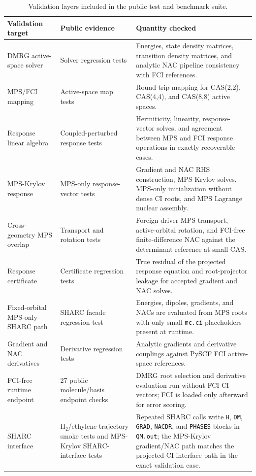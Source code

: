 \documentclass[journal=jctcce,manuscript=article]{achemso}
\begin{document}
\begin{table}[t]
\centering
\scriptsize
\caption{Validation layers included in the public test and benchmark suite.}
\label{tab:validation}
\begin{tabular}{p{}p{}p{}}
\toprule
Validation target & Public evidence & Quantity checked \\
\midrule
DMRG active-space solver & Solver regression tests & Energies, state density matrices, transition density matrices, and analytic NAC pipeline consistency with FCI references. \\
MPS/FCI mapping & Active-space map tests & Round-trip mapping for CAS(2,2), CAS(4,4), and CAS(8,8) active spaces. \\
Response linear algebra & Coupled-perturbed response tests & Hermiticity, linearity, response-vector solves, and agreement between MPS and FCI response operations in exactly recoverable cases. \\
MPS-Krylov response & MPS-only response-vector tests & Gradient and NAC RHS construction, MPS Krylov solves, MPS-only initialization without dense CI roots, and MPS Lagrange nuclear assembly. \\
Cross-geometry MPS overlap & Transport and rotation tests & Foreign-driver MPS transport, active-orbital rotation, and FCI-free finite-difference NAC against the determinant reference at small CAS. \\
Response certificate & Certificate regression tests & True residual of the projected response equation and root-projector leakage for accepted gradient and NAC solves. \\
Fixed-orbital MPS-only SHARC path & SHARC facade regression test & Energies, dipoles, gradients, and NACs are evaluated from MPS roots with only small \texttt{mc.ci} placeholders present at runtime. \\
Gradient and NAC derivatives & Derivative regression tests & Analytic gradients and derivative couplings against PySCF FCI active-space references. \\
FCI-free runtime endpoint & 27 public molecule/basis endpoint checks & DMRG root selection and derivative evaluation run without FCI CI vectors; FCI is loaded only afterward for error scoring. \\
SHARC interface & H$_2$/ethylene trajectory smoke tests and MPS-Krylov SHARC-interface tests & Repeated SHARC calls write \texttt{H}, \texttt{DM}, \texttt{GRAD}, \texttt{NACDR}, and \texttt{PHASES} blocks in \texttt{QM.out}; the MPS-Krylov gradient/NAC path matches the projected-CI interface path in the exact validation case. \\
\bottomrule
\end{tabular}
\end{table}
\end{document}
